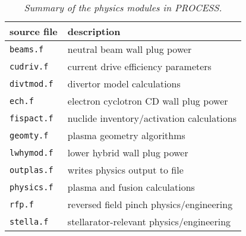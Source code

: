 \documentclass[11pt,a4paper]{report}
\makeatletter
\newcommand{\PSD}{\mbox{\it PROCESS}\@.\/ }
\makeatother
\begin{document}

\begin{table}
\begin{center}

\begin{tabular}{||l||l||} \hline
source file   & description \\ \hline
\tt beams.f   & \rm neutral beam wall plug power \\
\tt cudriv.f  & \rm current drive efficiency parameters \\
\tt divtmod.f & \rm divertor model calculations\\
\tt ech.f     & \rm electron cyclotron CD wall plug power \\
\tt fispact.f & \rm nuclide inventory/activation calculations \\
\tt geomty.f  & \rm plasma geometry algorithms \\
\tt lwhymod.f & \rm lower hybrid wall plug power \\
\tt outplas.f & \rm writes physics output to file \\
\tt physics.f & \rm plasma and fusion calculations \\
\tt rfp.f     & \rm reversed field pinch physics/engineering \\
\tt stella.f  & \rm stellarator-relevant physics/engineering \\ \hline
\end{tabular}
\end{center}
\caption[TABLE_PHY]{{\it
Summary of the physics modules in \PSD
}}
\label{tab:physics}
\end{table}

\end{document}
